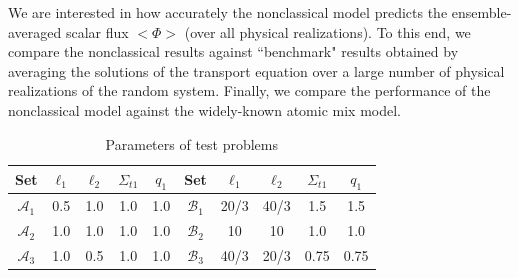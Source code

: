 \documentclass[12pt]{article}
\newcommand{\bl}{\big<}
\newcommand{\bg}{\big>}
\newcommand{\seta}{\mathcal{A}}
\newcommand{\setb}{\mathcal{B}}
\begin{document}
We are interested in how accurately the nonclassical model predicts the ensemble-averaged scalar flux $\bl\Phi\bg$ (over all physical realizations).
To this end, we compare the nonclassical results against ``benchmark" results obtained by averaging the solutions of the transport equation over a large number of physical realizations of the random system.
Finally, we compare the performance of the nonclassical model against the widely-known atomic mix model.
\begin{table}[htb]
\centering
\caption{Parameters of test problems}
\label{tab1} 
\begin{tabular}{||c|c|c|c|c||c|c|c|c|c||} \hline \hline
\textbf{Set}  & $\ell_1$ & $\ell_2$ & $\Sigma_{t1}$ &$q_1$ & \textbf{Set}  & $\ell_1$ & $\ell_2$ & $\Sigma_{t1}$ &$q_1$ \\ \hline\hline
$\seta_1$ & 0.5 & 1.0 & 1.0 & 1.0 & $\setb_1$ & 20/3 & 40/3 & 1.5 & 1.5\\
\hline
$\seta_2$ & 1.0 & 1.0 & 1.0 & 1.0 & $\setb_2$ & 10 & 10 & 1.0 & 1.0\\
\hline
$\seta_3$ & 1.0 & 0.5 & 1.0 & 1.0 & $\setb_3$ & 40/3 & 20/3 & 0.75 & 0.75\\
 \hline\hline  
  \end{tabular}
\end{table}
\end{document}

